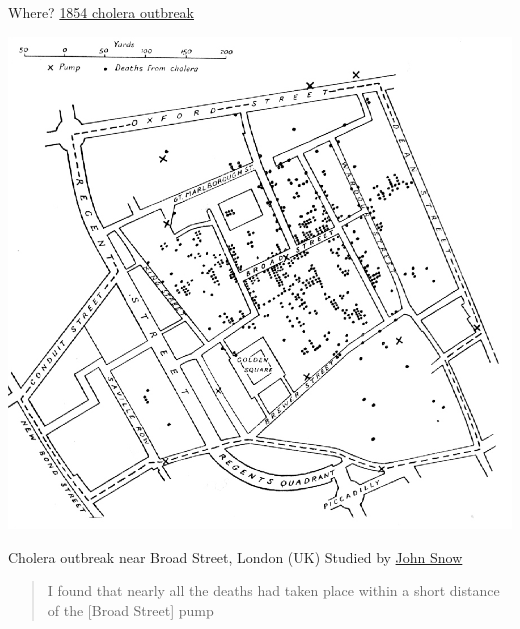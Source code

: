 \documentclass[aspectratio=169]{beamer}\usepackage[]{graphicx}\usepackage[]{xcolor}
\begin{document}
\begin{frame}{Where? \href{https://en.wikipedia.org/wiki/1854_Broad_Street_cholera_outbreak}{1854 cholera outbreak}}
    \begin{minipage}{0.5\textwidth}
    \includegraphics[width=\textwidth]{FIGS/Snow-cholera-map.jpg}
    \end{minipage}
    \begin{minipage}{0.45\textwidth}
        Cholera outbreak near Broad Street, London (UK)
        \vfill
        Studied by \href{https://en.wikipedia.org/wiki/John_Snow}{John Snow}

        \begin{quotation}
            I found that nearly all the deaths had taken place within a short distance of the [Broad Street] pump    
        \end{quotation}
            \end{minipage}
\end{frame}
\end{document}
